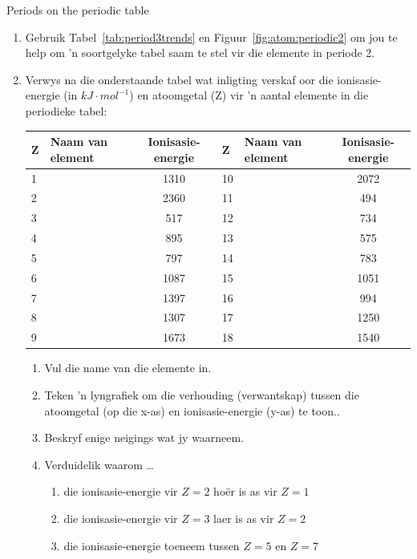 \begin{exercises}{Periods on the periodic table} \noindent
\begin{enumerate}[noitemsep, label=\textbf{\arabic*}. ]
\item Gebruik Tabel~\ref{tab:period3trends} en Figuur~\ref{fig:atom:periodic2} om jou te help om 'n soortgelyke tabel saam te stel vir die elemente in periode 2.
\item Verwys na die onderstaande tabel wat inligting verskaf oor die ionisasie-energie (in $kJ \cdot mol^{-1}$) en atoomgetal (Z) vir 'n aantal elemente in die periodieke tabel:\\
\begin{center}
\begin{tabular}{|l|l|c|l|l|c|}\hline
\textbf{Z} & Naam van element & Ionisasie-energie & \textbf{Z} & Naam van element & Ionisasie-energie \\\hline
1 &   & 1310 & 10 &        & 2072 \\\hline
2 &     & 2360 & 11 &      & 494  \\\hline
3 &    & 517  & 12 &   & 734  \\\hline
4 &  & 895  & 13 &   & 575  \\\hline
5 &      & 797  & 14 &     & 783  \\\hline
6 &     & 1087 & 15 &  & 1051 \\\hline
7 &   & 1397 & 16 &     & 994  \\\hline
8 &     & 1307 & 17 &    & 1250 \\\hline
9 &   & 1673 & 18 &       & 1540 \\\hline
\end{tabular}
\end{center}

\begin{enumerate}[noitemsep, label=\textbf{\alph*}. ]
 \item Vul die name van die elemente in.
\item Teken 'n lyngrafiek om die verhouding (verwantskap) tussen die atoomgetal (op die x-as) en ionisasie-energie (y-as) te toon..
\item Beskryf enige neigings wat jy waarneem.
\item Verduidelik waarom \ldots
	\begin{enumerate}[noitemsep, label=\textbf{\roman*}. ]
	\item die ionisasie-energie vir $Z=2$ ho\"{e}r is as vir $Z=1$
	\item die ionisasie-energie vir $Z=3$ laer is as vir $Z=2$
	\item die ionisasie-energie toeneem tussen $Z=5$ en $Z=7$
	\end{enumerate}


\end{enumerate}
\end{enumerate}
\end{exercises}
